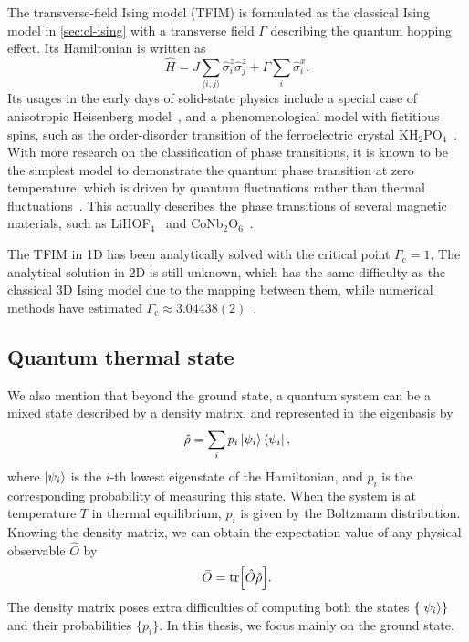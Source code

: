 The transverse-field Ising model (TFIM) is formulated as the classical Ising model in \cref{sec:cl-ising} with a transverse field $\Gamma$ describing the quantum hopping effect. Its Hamiltonian is written as
\begin{equation}
\hat{H} = J \sum_{\langle i, j \rangle} \hat{\sigma}^z_i \hat{\sigma}^z_j
+ \Gamma \sum_i \hat{\sigma}^x_i.
\label{eq:qu-ising}
\end{equation}
Its usages in the early days of solid-state physics include a special case of anisotropic Heisenberg model~\cite{katsura1962statistical}, and a phenomenological model with fictitious spins, such as the order-disorder transition of the ferroelectric crystal KH$_2$PO$_4$~\cite{de1963collective}. With more research on the classification of phase transitions, it is known to be the simplest model to demonstrate the quantum phase transition at zero temperature, which is driven by quantum fluctuations rather than thermal fluctuations~\cite{sachdev2001quantum, suzuki2013quantum}. This actually describes the phase transitions of several magnetic materials, such as LiHOF$_4$~\cite{bitko1996quantum} and CoNb$_2$O$_6$~\cite{coldea2010quantum}.

The TFIM in 1D has been analytically solved with the critical point $\Gamma_\text{c} = 1$. The analytical solution in 2D is still unknown, which has the same difficulty as the classical 3D Ising model due to the mapping between them, while numerical methods have estimated $\Gamma_\text{c} \approx 3.04438(2)$~\cite{blote2002cluster}.

\subsection{Quantum thermal state}

We also mention that beyond the ground state, a quantum system can be a mixed state described by a density matrix, and represented in the eigenbasis by
\begin{equation}
\hat{\rho} = \sum_i p_i \ket{\psi_i}\bra{\psi_i},
\end{equation}
where $\ket{\psi_i}$ is the $i$-th lowest eigenstate of the Hamiltonian, and $p_i$ is the corresponding probability of measuring this state. When the system is at temperature $T$ in thermal equilibrium, $p_i$ is given by the Boltzmann distribution. Knowing the density matrix, we can obtain the expectation value of any physical observable $\hat{O}$ by
\begin{equation}
\bar{O} = \tr[\hat{O} \hat{\rho}].
\label{eq:dm-obs}
\end{equation}
The density matrix poses extra difficulties of computing both the states $\left\{ \ket{\psi_i} \right\}$ and their probabilities $\{p_i\}$. In this thesis, we focus mainly on the ground state.
